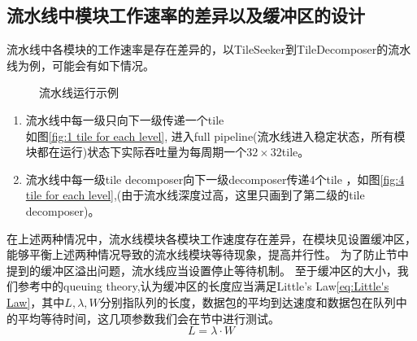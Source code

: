 \subsection{流水线中模块工作速率的差异以及缓冲区的设计}
流水线中各模块的工作速率是存在差异的，以TileSeeker到TileDecomposer的流水线为例，可能会有如下情况。

\begin{figure}[H]
    \centering
    \caption{流水线运行示例}
\end{figure}
\begin{enumerate}
    \item 流水线中每一级只向下一级传递一个tile \\
    如图\ref{fig:1 tile for each level}, 进入full pipeline(流水线进入稳定状态，所有模块都在运行)状态下实际吞吐量为每周期一个$32\times 32$tile。
    \item 流水线中每一级tile decomposer向下一级decomposer传递4个tile ，如图\ref{fig:4 tile for each level},(由于流水线深度过高，这里只画到了第二级的tile decomposer)。
\end{enumerate}
在上述两种情况中，流水线模块各模块工作速度存在差异，在模块见设置缓冲区，能够平衡上述两种情况导致的流水线模块等待现象，提高并行性。
为了防止节中提到的缓冲区溢出问题，流水线应当设置停止等待机制。
至于缓冲区的大小，我们参考\cite{CA}中的queuing theory,认为缓冲区的长度应当满足Little's Law\ref{eq:Little's Law}，其中$L,\lambda,W$分别指队列的长度，数据包的平均到达速度和数据包在队列中的平均等待时间，这几项参数我们会在节中进行测试。
\begin{equation}
    \label{eq:Little's Law}
    L = \lambda \cdot W
\end{equation}

